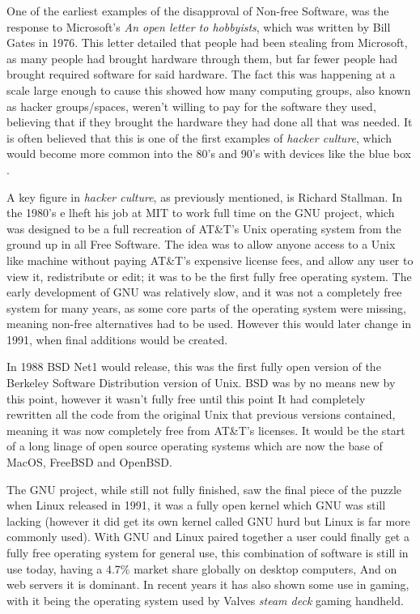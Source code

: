 \documentclass[a4paper,12pt]{article}
\begin{document}
{One of the earliest examples of the disapproval of Non-free Software, was the response to Microsoft's 
\textit{An open letter to hobbyists}, which was written by Bill Gates in 1976. This letter detailed 
that people had been stealing from Microsoft, as many people had brought hardware through 
them, but far fewer people had brought required software for said hardware. The fact this was happening 
at a scale large enough to cause this showed how many computing groups, also known as hacker groups/spaces, 
weren't willing to pay for the software they used, believing that if they brought the hardware they had done 
all that was needed\cite{OPENletter}. It is often believed that this is one of the first examples 
of \textit{hacker culture}, which would become more common into the 80's and 90's with devices like the blue
box \cite{BLUEbox}.

A key figure in \textit{hacker culture}, as previously mentioned, is Richard Stallman. In the 
 1980's e lheft his job at MIT to work full time on the GNU project, which was designed
to be a full recreation of AT\&T's Unix operating system from the ground up in all Free Software. 
The idea was to allow anyone access to a Unix like machine without paying AT\&T's expensive license 
fees, and allow any user to view it, redistribute or edit; it was to be the first fully free 
operating system. The early development of GNU was relatively slow, and it was not a completely free 
system for many years, as some core parts of the operating system were missing, meaning non-free 
alternatives had to be used. However this would later change in 1991, when final additions would
be created.

In 1988 BSD Net1 would release\cite{BSDnet1}, this was the first fully open version of the Berkeley 
Software Distribution version of Unix. BSD was by no means new by this point, however it wasn't 
fully free until this point It had completely rewritten all the code from the original 
Unix that previous versions contained, meaning it was now completely free from AT\&T's licenses.
It would be the start of a long linage of open source operating systems which are now the base
of MacOS, FreeBSD and OpenBSD.

The GNU project, while still not fully finished, saw the final piece of the puzzle when 
Linux\cite{LINUX} released in 1991, it was a fully open kernel which GNU was still lacking (however 
it did get its own kernel called GNU hurd but Linux is far more commonly used). With GNU and Linux 
paired together a user could finally get a fully free operating system for general use, this 
combination of software is still in use today, having a 4.7\% market share globally on desktop
computers\cite{LINUXmarket}, And on web servers it is dominant. In recent years it has also shown
some use in gaming, with it being the operating system used by Valves \textit{steam deck} gaming 
handheld\cite{STEAMdeck}.

}
\end{document}
